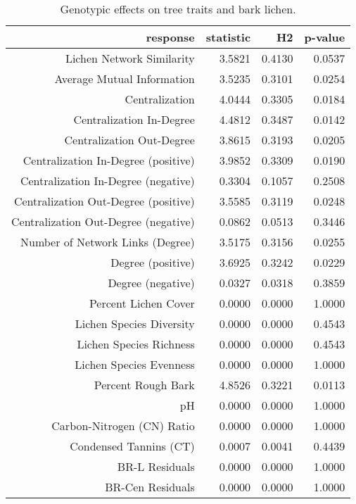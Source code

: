 \begin{table}[ht]
\centering
\begin{tabular}{rrrr}
  \hline
response & statistic & H2 & p-value \\ 
  \hline
Lichen Network Similarity & 3.5821 & 0.4130 & 0.0537 \\ 
  Average Mutual Information & 3.5235 & 0.3101 & 0.0254 \\ 
  Centralization & 4.0444 & 0.3305 & 0.0184 \\ 
  Centralization In-Degree & 4.4812 & 0.3487 & 0.0142 \\ 
  Centralization Out-Degree & 3.8615 & 0.3193 & 0.0205 \\ 
  Centralization In-Degree (positive) & 3.9852 & 0.3309 & 0.0190 \\ 
  Centralization In-Degree (negative) & 0.3304 & 0.1057 & 0.2508 \\ 
  Centralization Out-Degree (positive) & 3.5585 & 0.3119 & 0.0248 \\ 
  Centralization Out-Degree (negative) & 0.0862 & 0.0513 & 0.3446 \\ 
  Number of Network Links (Degree) & 3.5175 & 0.3156 & 0.0255 \\ 
  Degree (positive) & 3.6925 & 0.3242 & 0.0229 \\ 
  Degree (negative) & 0.0327 & 0.0318 & 0.3859 \\ 
  Percent Lichen Cover & 0.0000 & 0.0000 & 1.0000 \\ 
  Lichen Species Diversity & 0.0000 & 0.0000 & 0.4543 \\ 
  Lichen Species Richness & 0.0000 & 0.0000 & 0.4543 \\ 
  Lichen Species Evenness & 0.0000 & 0.0000 & 1.0000 \\ 
  Percent Rough Bark & 4.8526 & 0.3221 & 0.0113 \\ 
  pH & 0.0000 & 0.0000 & 1.0000 \\ 
  Carbon-Nitrogen (CN) Ratio & 0.0000 & 0.0000 & 1.0000 \\ 
  Condensed Tannins (CT) & 0.0007 & 0.0041 & 0.4439 \\ 
  BR-L Residuals & 0.0000 & 0.0000 & 1.0000 \\ 
  BR-Cen Residuals & 0.0000 & 0.0000 & 1.0000 \\ 
   \hline
\end{tabular}
\caption{Genotypic effects on tree traits and bark lichen.} 
\label{tab:h2_table}
\end{table}
